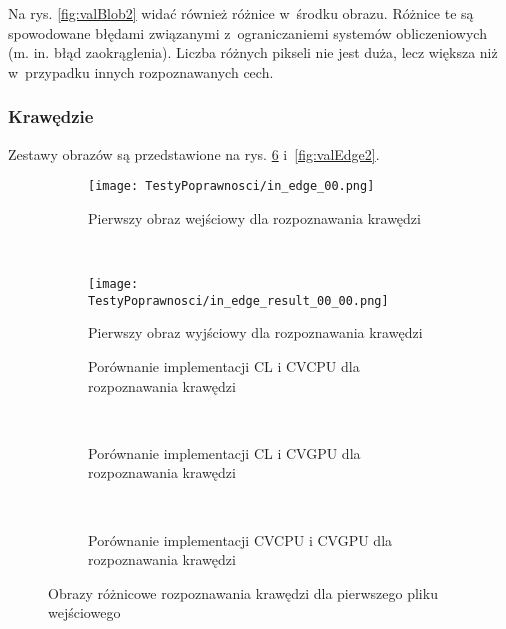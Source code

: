 Na rys. \ref{fig:valBlob2} widać również różnice w~środku obrazu. Różnice te są spowodowane błędami związanymi z~ograniczaniemi systemów obliczeniowych (m. in. błąd zaokrąglenia). Liczba różnych pikseli nie jest duża, lecz większa niż w~przypadku innych rozpoznawanych cech.


\subsubsection{Krawędzie}
\label{subsubsec:krawedzieRysunki}

Zestawy obrazów są przedstawione na rys. \ref{fig:valEdge0} i~\ref{fig:valEdge2}. 

\begin{figure}[h]

\begin{center}
\begin{subfigure}[t]{0.3\textwidth}
\texttt{[image: TestyPoprawnosci/in\_edge\_00.png]}
\caption{Pierwszy obraz wejściowy dla rozpoznawania krawędzi}
\label{fig:valEdge00}
\end{subfigure}
~
\begin{subfigure}[t]{0.3\textwidth}
\texttt{[image: TestyPoprawnosci/in\_edge\_result\_00\_00.png]}
\caption{Pierwszy obraz wyjściowy dla rozpoznawania krawędzi}
\label{fig:valEdgeResult00}
\end{subfigure}
\end{center}

\begin{subfigure}[t]{0.3\textwidth}
	\centering
	\setlength\fboxsep{0pt}
	\setlength\fboxrule{0.5pt}
	\caption{Porównanie implementacji CL i CVCPU dla rozpoznawania krawędzi}
	\label{fig:valEdge0CLCVCPU}
\end{subfigure}
~
\begin{subfigure}[t]{0.3\textwidth}
	\centering
	\setlength\fboxsep{0pt}
	\setlength\fboxrule{0.5pt}
	\caption{Porównanie implementacji CL i CVGPU dla rozpoznawania krawędzi}
	\label{fig:valEdge0CLCVGPU}
\end{subfigure}
~
\begin{subfigure}[t]{0.3\textwidth}
	\centering
	\setlength\fboxsep{0pt}
	\setlength\fboxrule{0.5pt}
	\caption{Porównanie implementacji CVCPU i CVGPU dla rozpoznawania krawędzi}
	\label{fig:valEdge0CVCPUCVGPU}                 
\end{subfigure}
\caption{Obrazy różnicowe rozpoznawania krawędzi dla pierwszego pliku wejściowego}

\label{fig:valEdge0}
\end{figure}

